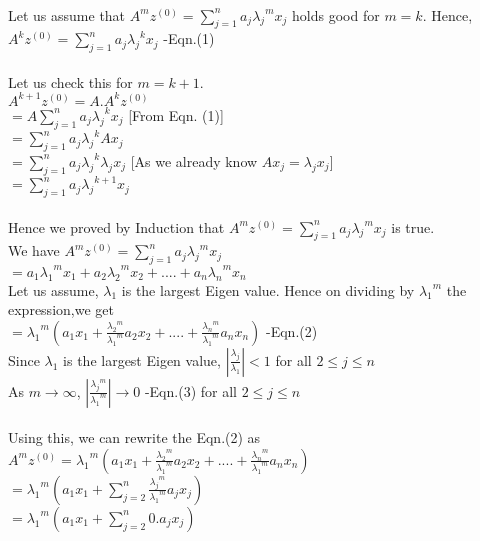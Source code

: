 \documentclass{article}
\begin{document}
\\
Let us assume that ${A^m}{z^{(0)}} = \sum_{j=1}^{n}{a_j}{{{\lambda}_j}^m}{x_j}$  holds good for $m = k$.
Hence, ${A^k}{z^{(0)}} = \sum_{j=1}^{n}{a_j}{{{\lambda}_j}^k}{x_j}$   -Eqn.(1)\\
\\
Let us check this for $m = k + 1$.\\
${A^{k+1}}{z^{(0)}} = A.{A^k}{z^{(0)}}$\\
$ = A\sum_{j=1}^{n}{a_j}{{{\lambda}_j}^k}{x_j}$ [From Eqn. (1)]\\
$ = \sum_{j=1}^{n}{a_j}{{{\lambda}_j}^k}A{x_j}$\\
$ = \sum_{j=1}^{n}{a_j}{{{\lambda}_j}^k}{{\lambda}_j}{x_j}$ [As we already know ${A}{x_j} = {{\lambda}_j}{x_j}$]\\
$ = \sum_{j=1}^{n}{a_j}{{{\lambda}_j}^{k+1}}{x_j}$\\
\\
Hence we proved by Induction that ${A^m}{z^{(0)}} = \sum_{j=1}^{n}{a_j}{{{\lambda}_j}^m}{x_j}$ is true.
\\
We have ${A^m}{z^{(0)}} = \sum_{j=1}^{n}{a_j}{{{\lambda}_j}^m}{x_j}$\\
$ = {a_1}{{{\lambda}_1}^m}{x_1} + {a_2}{{{\lambda}_2}^m}{x_2} + .... + {a_n}{{{\lambda}_n}^m}{x_n}$\\
Let us assume, ${{\lambda}_1}$ is the largest Eigen value. Hence on dividing by ${{{\lambda}_1}^m}$ the expression,we get\\
$ = {{{\lambda}_1}^m}({a_1}{x_1} + \frac{{{\lambda}_2}^m}{{{\lambda}_1}^m}{a_2}{x_2} + .... + \frac{{{\lambda}_n}^m}{{{\lambda}_1}^m}{a_n}{x_n})$ -Eqn.(2)\\
Since ${{\lambda}_1}$ is the largest Eigen value, $\left|\frac{{\lambda}_j}{{\lambda}_1}\right| < 1$ for all $2 \leq j \leq n$\\
As $m \rightarrow \infty$,  $\left|\frac{{{\lambda}_j}^m}{{{\lambda}_1}^m}\right| \rightarrow 0$ -Eqn.(3) for all $2 \leq j \leq n$\\
\\
Using this, we can rewrite the Eqn.(2) as\\
${A^m}{z^{(0)}} = {{{\lambda}_1}^m}({a_1}{x_1} + \frac{{{\lambda}_2}^m}{{{\lambda}_1}^m}{a_2}{x_2} + .... + \frac{{{\lambda}_n}^m}{{{\lambda}_1}^m}{a_n}{x_n})$\\
$ = {{{\lambda}_1}^m}({a_1}{x_1} + \sum_{j=2}^{n}\frac{{{\lambda}_j}^m}{{{\lambda}_1}^m}{a_j}{x_j})$\\
$ = {{{\lambda}_1}^m}({a_1}{x_1} + \sum_{j=2}^{n}0.{a_j}{x_j})$\\
\end{document}
